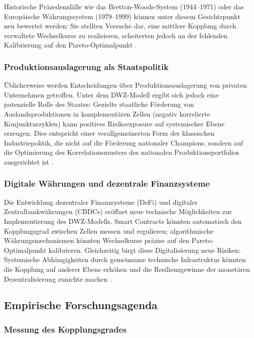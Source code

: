 \documentclass[a4paper, 12pt, twoside, openright]{report}
\theoremstyle{definition}
\theoremstyle{definition}
\begin{document}
Historische Präzedenzfälle wie das Bretton-Woods-System (1944--1971) oder das Europäische
Währungssystem (1979--1999) können unter diesem Gesichtspunkt neu bewertet werden:
Sie stellten Versuche dar, eine mittlere Kopplung durch verwaltete Wechselkurse zu realisieren,
scheiterten jedoch an der fehlenden Kalibrierung auf den Pareto-Optimalpunkt \citep{eichengreen1998globalizing}.

\subsubsection{Produktionsauslagerung als Staatspolitik}

Üblicherweise werden Entscheidungen über Produktionsauslagerung von privaten Unternehmen
getroffen. Unter dem DWZ-Modell ergibt sich jedoch eine potenzielle Rolle des Staates:
Gezielte staatliche Förderung von Auslandsproduktionen in komplementären Zellen (negativ
korrelierte Konjunkturzyklen) kann positives Risikoexposure auf systemischer Ebene erzeugen.
Dies entspricht einer verallgemeinerten Form der klassischen Industriepolitik, die nicht
auf die Förderung nationaler Champions, sondern auf die Optimierung des Korrelationsmusters
des nationalen Produktionsportfolios ausgerichtet ist \citep{rodrik2004industrial}.

\subsubsection{Digitale Währungen und dezentrale Finanzsysteme}

Die Entwicklung dezentraler Finanzsysteme (DeFi) und digitaler Zentralbankwährungen
(CBDCs) eröffnet neue technische Möglichkeiten zur Implementierung des DWZ-Modells.
Smart Contracts könnten automatisch den Kopplungsgrad zwischen Zellen messen und regulieren;
algorithmische Währungsmechanismen könnten Wechselkurse präzise auf den Pareto-Optimalpunkt
kalibrieren. Gleichzeitig birgt diese Digitalisierung neue Risiken: Systemische Abhängigkeiten
durch gemeinsame technische Infrastruktur könnten die Kopplung auf anderer Ebene erhöhen
und die Resilienzgewinne der monetären Dezentralisierung zunichte machen \citep{borio2021cbdc}.

\subsection{Empirische Forschungsagenda}

\subsubsection{Messung des Kopplungsgrades}
\end{document}
